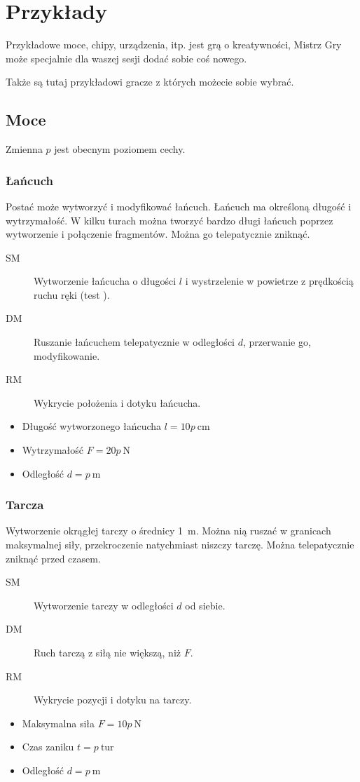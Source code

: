 \chapter{Przykłady}
Przykładowe moce, chipy, urządzenia, itp.
\kosmoramus{} jest grą o kreatywności, Mistrz Gry może specjalnie dla waszej sesji dodać sobie coś nowego.

Także są tutaj przykładowi gracze z których możecie sobie wybrać.

\section{Moce}
Zmienna $p$ jest obecnym poziomem cechy.

\subsection{Łańcuch}
Postać może wytworzyć i modyfikować łańcuch.
Łańcuch ma określoną długość i wytrzymałość.
W kilku turach można tworzyć bardzo długi łańcuch poprzez wytworzenie i połączenie fragmentów.
Można go telepatycznie zniknąć.
\begin{description}
	\item[SM] Wytworzenie łańcucha o długości $l$ i wystrzelenie w powietrze z prędkością ruchu ręki (test \aba{}).
	\item[DM] Ruszanie łańcuchem telepatycznie w odległości $d$, przerwanie go, modyfikowanie.
	\item[RM] Wykrycie położenia i dotyku łańcucha.
\end{description}
\begin{itemize}
	\item Długość wytworzonego łańcucha $l = 10p \ \si{\centi\metre}$
	\item Wytrzymałość $F = 20p \ \si{\newton}$
	\item Odległość $d = p \ \si{\metre}$
\end{itemize}

\subsection{Tarcza}
Wytworzenie okrągłej tarczy o średnicy \SI{1}{\metre}.
Można nią ruszać w granicach maksymalnej siły, przekroczenie natychmiast niszczy tarczę.
Można telepatycznie zniknąć przed czasem.
\begin{description}
	\item[SM] Wytworzenie tarczy w odległości $d$ od siebie.
	\item[DM] Ruch tarczą z siłą nie większą, niż $F$.
	\item[RM] Wykrycie pozycji i dotyku na tarczy.
\end{description}
\begin{itemize}
	\item Maksymalna siła $F = 10p \ \si{\newton}$
	\item Czas zaniku $t = p \ \text{tur}$
	\item Odległość $d = p \ \si{\metre}$
\end{itemize}

